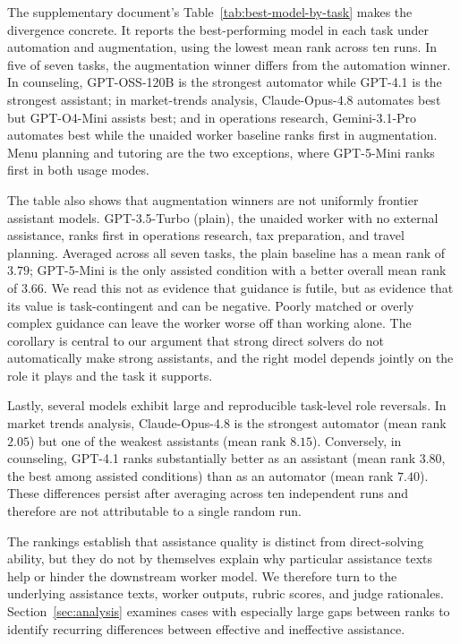 The supplementary document's Table~\ref{tab:best-model-by-task} makes the divergence concrete. It reports the best-performing model in each task under automation and augmentation, using the lowest mean rank across ten runs. In five of seven tasks, the augmentation winner differs from the automation winner. In counseling, GPT-OSS-120B is the strongest automator while GPT-4.1 is the strongest assistant; in market-trends analysis, Claude-Opus-4.8 automates best but GPT-O4-Mini assists best; and in operations research, Gemini-3.1-Pro automates best while the unaided worker baseline ranks first in augmentation. Menu planning and tutoring are the two exceptions, where GPT-5-Mini ranks first in both usage modes.

The table also shows that augmentation winners are not uniformly frontier assistant models. GPT-3.5-Turbo (plain), the unaided worker with no external assistance, ranks first in operations research, tax preparation, and travel planning. Averaged across all seven tasks, the plain baseline has a mean rank
of $3.79$; GPT-5-Mini is the only assisted condition with a better overall mean rank of $3.66$. We read this not as evidence that guidance is futile, but as
evidence that its value is task-contingent and can be negative. Poorly matched or overly complex guidance can leave the worker worse off than working alone. The corollary is central to our argument that strong direct solvers do not automatically make strong assistants, and the right model depends jointly on the role it plays and the task it supports.

Lastly, several models exhibit large and reproducible
task-level role reversals. In market trends analysis, Claude-Opus-4.8 is the strongest automator (mean rank $2.05$) but one of the weakest assistants (mean rank $8.15$). Conversely, in counseling, GPT-4.1 ranks substantially better as an assistant (mean rank $3.80$, the best among assisted conditions) than as an automator (mean rank $7.40$). These differences persist after averaging across ten independent runs and therefore are not attributable to a single random run.

The rankings establish that assistance quality is distinct from direct-solving ability, but they do not by themselves explain why particular assistance texts
help or hinder the downstream worker model. We therefore turn to the underlying assistance texts, worker outputs, rubric scores, and judge rationales. 
Section~\ref{sec:analysis} examines cases with especially large gaps between ranks to identify recurring differences between effective and ineffective assistance.

